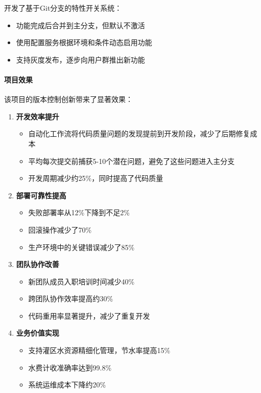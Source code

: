 开发了基于Git分支的特性开关系统：

\begin{itemize}
\tightlist
\item
  功能完成后合并到主分支，但默认不激活
\item
  使用配置服务根据环境和条件动态启用功能
\item
  支持灰度发布，逐步向用户群推出新功能
\end{itemize}

\paragraph{项目效果}\label{ux9879ux76eeux6548ux679c}

该项目的版本控制创新带来了显著效果：

\begin{enumerate}
\def\labelenumi{\arabic{enumi}.}
\tightlist
\item
  \textbf{开发效率提升}

  \begin{itemize}
  \tightlist
  \item
    自动化工作流将代码质量问题的发现提前到开发阶段，减少了后期修复成本
  \item
    平均每次提交前捕获5-10个潜在问题，避免了这些问题进入主分支
  \item
    开发周期减少约25\%，同时提高了代码质量
  \end{itemize}
\item
  \textbf{部署可靠性提高}

  \begin{itemize}
  \tightlist
  \item
    失败部署率从12\%下降到不足2\%
  \item
    回滚操作减少了70\%
  \item
    生产环境中的关键错误减少了85\%
  \end{itemize}
\item
  \textbf{团队协作改善}

  \begin{itemize}
  \tightlist
  \item
    新团队成员入职培训时间减少40\%
  \item
    跨团队协作效率提高约30\%
  \item
    代码重用率显著提升，减少了重复开发
  \end{itemize}
\item
  \textbf{业务价值实现}

  \begin{itemize}
  \tightlist
  \item
    支持灌区水资源精细化管理，节水率提高15\%
  \item
    水费计收准确率达到99.8\%
  \item
    系统运维成本下降约20\%
  \end{itemize}
\end{enumerate}


